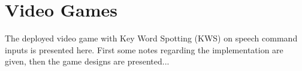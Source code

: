 
\chapter{Video Games}\label{sec:game}
The deployed video game with Key Word Spotting (KWS) on speech command inputs is presented here.
First some notes regarding the implementation are given, then the game designs are presented...





